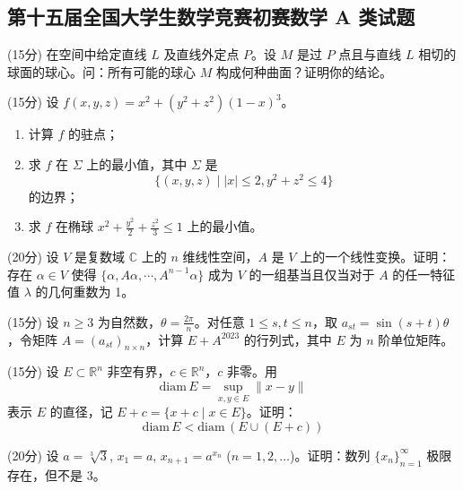 \documentclass[loose]{ExBook}
\begin{document}
\subsection{第十五届全国大学生数学竞赛初赛数学 A 类试题}
\begin{qitems}

    \begin{bbox}
        \qitem (15分) 在空间中给定直线 \( L \) 及直线外定点 \( P \)。设 \( M \) 是过 \( P \) 点且与直线 \( L \) 相切的球面的球心。问：所有可能的球心 \( M \) 构成何种曲面？证明你的结论。
    \end{bbox}

    \begin{bbox}
        \qitem (15分) 设 \( f(x, y, z) = x^2 + (y^2 + z^2)(1 - x)^3 \)。
        \begin{enumerate}[label=(\arabic*)]
            \item 计算 \( f \) 的驻点；
            \item 求 \( f \) 在 \( \Sigma \) 上的最小值，其中 \( \Sigma \) 是
            \[\{(x, y, z) \mid |x| \leq 2, y^2 + z^2 \leq 4\}\]
            的边界；
            \item 求 \( f \) 在椭球 \( x^2 + \frac{y^2}{2} + \frac{z^2}{3} \leq 1 \) 上的最小值。
        \end{enumerate}
    \end{bbox}

    \begin{bbox}
        \qitem (20分) 设 \( V \) 是复数域 \( \mathbb{C} \) 上的 \( n \) 维线性空间，\( A \) 是 \( V \) 上的一个线性变换。证明：存在 \( \alpha \in V \) 使得
        \(
        \{\alpha, A\alpha, \cdots, A^{n-1}\alpha\}
        \)
        成为 \( V \) 的一组基当且仅当对于 \( A \) 的任一特征值 \( \lambda \) 的几何重数为 1。
    \end{bbox}

    \begin{bbox}
        \qitem (15分) 设 \( n \geq 3 \) 为自然数，\( \theta = \frac{2\pi}{n} \)。对任意 \( 1 \leq s, t \leq n \)，取 \( a_{st} = \sin(s + t)\theta \)，令矩阵 \( A = (a_{st})_{n \times n} \)，计算 \( E + A^{2023} \) 的行列式，其中 \( E \) 为 \( n \) 阶单位矩阵。
    \end{bbox}

    \begin{bbox}
        \qitem (15分) 设 \( E \subset \mathbb{R}^n \) 非空有界，\( c \in \mathbb{R}^n \)，\( c \) 非零。用
        \[
        \mathrm{diam}\, E = \sup_{x,y \in E} \|x - y\|
        \]
        表示 \( E \) 的直径，记 \( E + c = \{x + c \mid x \in E\} \)。证明：
        \[
        \mathrm{diam}\, E < \mathrm{diam}\,(E \cup (E + c))
        \]
    \end{bbox}

    \begin{bbox}
        \qitem (20分) 设 \( a = \sqrt[3]{3} \), \( x_1 = a \), \( x_{n+1} = a^{x_n} \) (\( n = 1, 2, \ldots \))。证明：数列 \(\{x_n\}_{n=1}^{\infty}\) 极限存在，但不是 3。
    \end{bbox}

\end{qitems}
\end{document}
